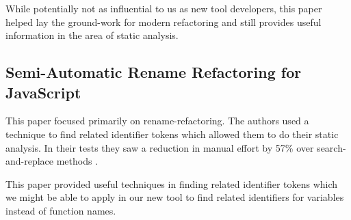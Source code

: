 \documentclass{sig-alternate}
\begin{document}
While potentially not as influential to us as new tool developers, this paper helped lay the ground-work for modern refactoring and still provides useful information in the area of static analysis.

\subsection{Semi-Automatic Rename Refactoring for JavaScript}
This paper focused primarily on rename-refactoring.
The authors used a technique to find related identifier tokens which allowed them to do their static analysis.
In their tests they saw a reduction in manual effort by 57\% over search-and-replace methods \cite{automatic}.

This paper provided useful techniques in finding related identifier tokens which we might be able to apply in our new tool to find related identifiers for variables instead of function names.




%

%
%
\end{document}
